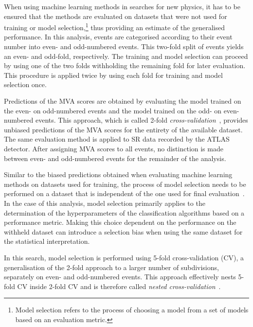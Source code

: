 When using machine learning methods in searches for new physics, it
has to be ensured that the methods are evaluated on datasets that were
not used for training or model selection,\footnote{Model selection
  refers to the process of choosing a model from a set of models based
  on an evaluation metric.} thus providing an estimate of the
generalised performance. In this analysis, events are categorised
according to their event number into even- and odd-numbered
events. This two-fold split of events yields an even- and odd-fold,
respectively. The training and model selection can proceed by using
one of the two folds withholding the remaining fold for later
evaluation. This procedure is applied twice by using each fold for
training and model selection once.

Predictions of the MVA scores are obtained by evaluating the model
trained on the even- on odd-numbered events and the model trained on
the odd- on even-numbered events. This approach, which is called
2-fold \emph{cross-validation}~\cite{hastie09,bishop06}, provides
unbiased predictions of the MVA scores for the entirety of the
available dataset. The same evaluation method is applied to SR
data recorded by the ATLAS detector. After assigning MVA scores
to all events, no distinction is made between even- and odd-numbered
events for the remainder of the analysis.


Similar to the biased predictions obtained when evaluating machine
learning methods on datasets used for training, the process of model
selection needs to be performed on a dataset that is independent of
the one used for final evaluation~\cite{cawley10}. In the case of this
analysis, model selection primarily applies to the determination of
the hyperparameters of the classification algorithms based on a
performance metric. Making this choice dependent on the performance on
the withheld dataset can introduce a selection bias when using the
same dataset for the statistical interpretation.

In this search, model selection is performed using 5-fold
cross-validation (CV), a generalisation of the 2-fold approach to a
larger number of subdivisions, separately on even- and odd-numbered
events. This approach effectively nests 5-fold CV inside 2-fold CV and
is therefore called \emph{nested
  cross-validation}~\cite{cawley10,stone74}.

